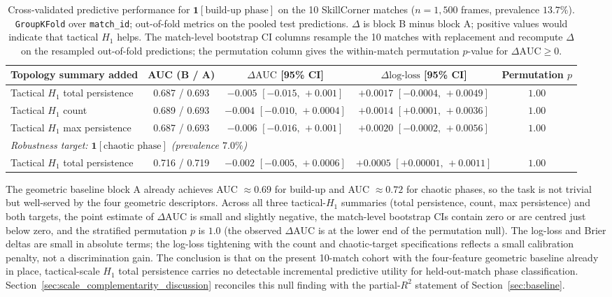 \begin{table}[H]
  \centering
  \caption{Cross-validated predictive performance for \(\mathbf{1}[\text{build-up phase}]\) on the 10 SkillCorner matches (\(n=1{,}500\) frames, prevalence \(13.7\%\)). \texttt{GroupKFold} over \texttt{match\_id}; out-of-fold metrics on the pooled test predictions. \(\Delta\) is block B minus block A; positive values would indicate that tactical \(H_1\) helps. The match-level bootstrap CI columns resample the 10 matches with replacement and recompute \(\Delta\) on the resampled out-of-fold predictions; the permutation column gives the within-match permutation \(p\)-value for \(\Delta\text{AUC}\geq 0\).}
  \label{tab:predictive}
  \begin{tabular}{@{}lcccc@{}}
      \toprule
      Topology summary added & AUC (B / A) & \(\Delta\text{AUC}\) [95\% CI] & \(\Delta\text{log-loss}\) [95\% CI] & Permutation \(p\) \\
      \midrule
      Tactical \(H_1\) total persistence & 0.687 / 0.693 & \(-0.005\) \([-0.015,\,+0.001]\) & \(+0.0017\) \([-0.0004,\,+0.0049]\) & \(1.00\) \\
      Tactical \(H_1\) count             & 0.689 / 0.693 & \(-0.004\) \([-0.010,\,+0.0004]\) & \(+0.0014\) \([+0.0001,\,+0.0036]\) & \(1.00\) \\
      Tactical \(H_1\) max persistence   & 0.687 / 0.693 & \(-0.006\) \([-0.016,\,+0.001]\) & \(+0.0020\) \([-0.0002,\,+0.0056]\) & \(1.00\) \\
      \midrule
      \multicolumn{5}{l}{\emph{Robustness target: \(\mathbf{1}[\text{chaotic phase}]\) (prevalence \(7.0\%\))}} \\
      Tactical \(H_1\) total persistence & 0.716 / 0.719 & \(-0.002\) \([-0.005,\,+0.0006]\) & \(+0.0005\) \([+0.00001,\,+0.0011]\) & \(1.00\) \\
      \bottomrule
  \end{tabular}
\end{table}

The geometric baseline block A already achieves AUC \(\approx 0.69\) for build-up and AUC \(\approx 0.72\) for chaotic phases, so the task is not trivial but well-served by the four geometric descriptors. Across all three tactical-\(H_1\) summaries (total persistence, count, max persistence) and both targets, the point estimate of \(\Delta\text{AUC}\) is small and slightly negative, the match-level bootstrap CIs contain zero or are centred just below zero, and the stratified permutation \(p\) is \(1.0\) (the observed \(\Delta\text{AUC}\) is at the lower end of the permutation null). The log-loss and Brier deltas are small in absolute terms; the log-loss tightening with the count and chaotic-target specifications reflects a small calibration penalty, not a discrimination gain. The conclusion is that on the present 10-match cohort with the four-feature geometric baseline already in place, tactical-scale \(H_1\) total persistence carries no detectable incremental predictive utility for held-out-match phase classification. Section~\ref{sec:scale_complementarity_discussion} reconciles this null finding with the partial-\(R^2\) statement of Section~\ref{sec:baseline}.
